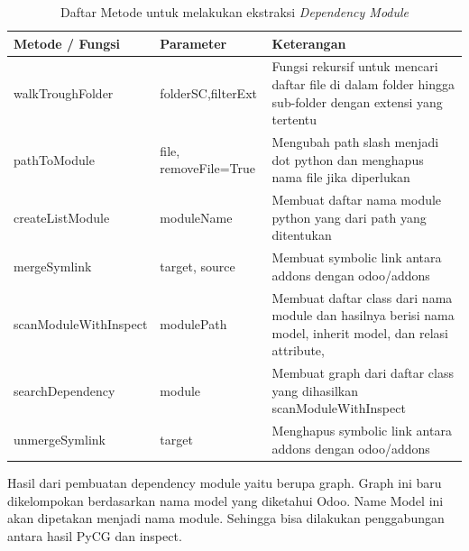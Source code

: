 \begingroup
\setlength{\LTleft}{-20cm plus -1fill}
\setlength{\LTright}{\LTleft} %
\begin{small}
	\begin{longtable}{|p{4cm}|p{3cm}|p{6cm}|}
		\caption{Daftar Metode untuk melakukan ekstraksi \textit{Dependency Module} }\\
		\hline
		\textbf{Metode / Fungsi} & \textbf{Parameter} & \textbf{Keterangan}\\
		\endfirsthead
		
		\hline  

		walkTroughFolder
		& folderSC,filterExt
		 & Fungsi rekursif untuk mencari daftar file di dalam folder hingga sub-folder dengan extensi yang tertentu  \\

		 \hline  
		
		 pathToModule
		& file, removeFile=True
		 &  Mengubah path slash menjadi dot python dan menghapus nama file jika diperlukan \\
		

		 \hline
		
		 createListModule
		& moduleName
		 & Membuat daftar nama module python yang dari path yang ditentukan \\
		
		
		 \hline  
		
		mergeSymlink
		& target, source
		 & Membuat symbolic link antara addons dengan odoo/addons  \\
		\hline  

		scanModuleWithInspect
		& modulePath
		 &  Membuat daftar class dari nama module dan hasilnya berisi nama model, inherit model, dan relasi attribute,  \\
		\hline  

		searchDependency
		& module
		 & Membuat graph dari daftar class yang dihasilkan scanModuleWithInspect \\
		\hline  

		unmergeSymlink
		& target
		 & Menghapus symbolic link antara addons dengan odoo/addons  \\
		\hline  


	\end{longtable}
\end{small}
\endgroup

Hasil dari pembuatan dependency module yaitu berupa graph. Graph ini baru dikelompokan berdasarkan nama model yang diketahui Odoo. Name Model ini akan dipetakan menjadi nama module. Sehingga bisa dilakukan penggabungan antara hasil PyCG dan inspect.

